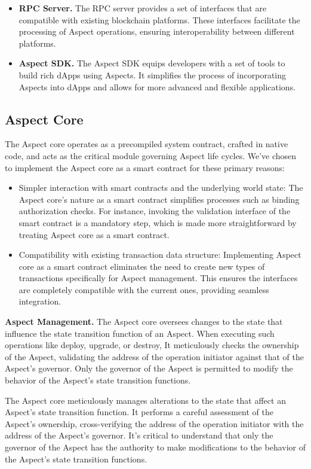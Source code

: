 \begin{itemize}
  \item \textbf{RPC Server.} The RPC server provides a set of interfaces that are compatible with existing blockchain platforms. These interfaces facilitate the processing of Aspect operations, ensuring interoperability between different platforms.
  
  \item \textbf{Aspect SDK.} The Aspect SDK equips developers with a set of tools to build rich dApps using Aspects. It simplifies the process of incorporating Aspects into dApps and allows for more advanced and flexible applications.
\end{itemize}

\subsection{Aspect Core}

The Aspect core operates as a precompiled system contract, crafted in native code, and acts as the critical module governing Aspect life cycles. We've chosen to implement the Aspect core as a smart contract for these primary reasons:

\begin{itemize}
  \item Simpler interaction with smart contracts and the underlying world state: The Aspect core's nature as a smart contract simplifies processes such as binding authorization checks. For instance, invoking the validation interface of the smart contract is a mandatory step, which is made more straightforward by treating Aspect core as a smart contract.
  \item Compatibility with existing transaction data structure: Implementing Aspect core as a smart contract eliminates the need to create new types of transactions specifically for Aspect management. This ensures the interfaces are completely compatible with the current ones, providing seamless integration.
\end{itemize}

\textbf{Aspect Management.} The Aspect core oversees changes to the state that influence the state transition function of an Aspect. When executing such operations like deploy, upgrade, or destroy, It meticulously checks the ownership of the Aspect, validating the address of the operation initiator against that of the Aspect's governor. Only the governor of the Aspect is permitted to modify the behavior of the Aspect's state transition functions.

The Aspect core meticulously manages alterations to the state that affect an Aspect's state transition function. It performs a careful assessment of the Aspect's ownership, cross-verifying the address of the operation initiator with the address of the Aspect's governor. It's critical to understand that only the governor of the Aspect has the authority to make modifications to the behavior of the Aspect's state transition functions.

